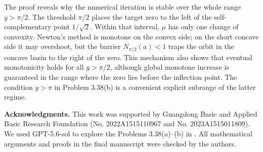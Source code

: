 \documentclass[11pt]{article}
\theoremstyle{remark}
\begin{document}
The proof reveals why the numerical iteration is stable over the whole range
$y>\pi/2$.  The threshold $\pi/2$ places the target zero to the left of the
self-complementary point $1/\sqrt2$.  Within that interval, $\mu$ has only one
change of convexity.  Newton's method is monotone on the convex side; on the
short concave side it may overshoot, but the barrier $N_{\pi/2}(a)<1$ traps the
orbit in the concave basin to the right of the zero.  This mechanism also
shows that eventual monotonicity holds for all $y>\pi/2$, although global
monotone increase is guaranteed in the range where the zero lies before the
inflection point.  The condition $y>\pi$ in Problem 3.38(b) is a convenient
explicit subrange of the latter regime.


\medskip
\noindent\textbf{Acknowledgments.}
This work was supported by Guangdong Basic and Applied Basic Research Foundation (No. 2022A1515110967 and No. 2023A1515011809). We used GPT-5.6-sol to 
explore the Problems 3.38(a)--(b) in \cite{VuorinenSurvey}.  All mathematical arguments and proofs in the final manuscript were checked by the authors.
\end{document}
